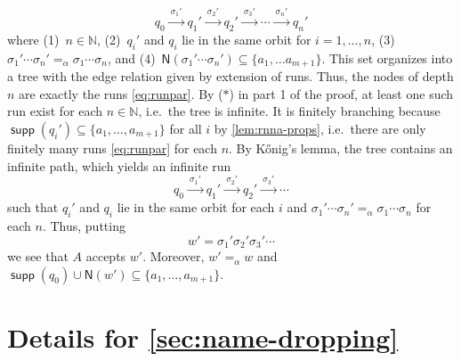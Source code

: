 \documentclass[final,a4paper,UKenglish,thm-restate,autoref,numberwithinsect]{lipics-v2021}
\newcommand{\Names}[1]{\mathsf{N}(#1)}
\numberwithin{equation}{section}
\newcommand{\xto}[1]{\xrightarrow{~#1~}}
\newcommand{\seq}{\subseteq}
\newcommand{\Nat}{{\mathbb{N}}}
\newcommand{\+}[1]{\mathcal{#1}\xspace}
\DeclareMathOperator{\supp}{\mathsf{supp}} %
\theoremstyle{definition}
\begin{document}
\begin{enumerate}
  \begin{equation}\label{eq:runpar}
    q_0 \xto{\sigma_1'} q_1' \xto{\sigma_2'} q_2' \xto{\sigma_3'} \cdots
    \xto{\sigma_n'} q_n'
  \end{equation}
  where (1)~$n\in \Nat$, (2)~$q_i'$ and $q_i$ lie in the same orbit
  for $i=1,\ldots, n$, (3)~$\sigma_1'\cdots \sigma_n' =_\alpha \sigma_1\cdots \sigma_n$, and
  (4)~$\Names{\sigma_1'\cdots \sigma_n'}\seq \{a_1,\ldots
  a_{m+1}\}$. This set organizes into a tree with the edge relation
  given by extension of runs. Thus, the nodes of depth $n$ are exactly
  the runs \eqref{eq:runpar}. By ($\ast$) in part 1 of the proof, at least one
  such run exist for each $n\in \Nat$, i.e.~the tree is infinite. It
  is finitely branching because
  $\supp(q_i')\seq \{a_1,\ldots, a_{m+1}\}$ for all $i$ by \autoref{lem:rnna-props}, i.e.~there
  are only finitely many runs \eqref{eq:runpar} for each $n$. By
  K\H{o}nig's
  lemma, the tree contains an infinite path, which yields an infinite run
  \[
    q_0 \xto{\sigma_1'} q_1' \xto{\sigma_2'} q_2' \xto{\sigma_3'}
    \cdots
  \]
  such that $q_i'$ and $q_i$ lie in the same orbit for each $i$ and
  $\sigma_1'\cdots \sigma_n'=_\alpha \sigma_1\cdots \sigma_n$ for each
  $n$. Thus, putting
  \[
    w'= \sigma_1'\sigma_2'\sigma_3'\cdots
  \]
  we see that $A$ accepts $w'$. Moreover, $w'=_\alpha w$ and
  $\supp(q_0)\cup \Names{w'}\seq \{a_1,\ldots, a_{m+1}\}$. %
\end{enumerate}

\section{Details for \autoref{sec:name-dropping}}
\end{document}

